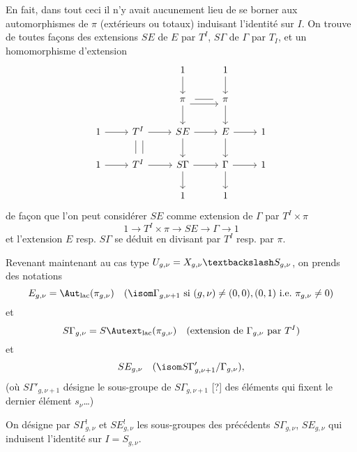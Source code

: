 En fait, dans tout ceci il n'y avait aucunement lieu de se borner aux automorphismes de $\pi$ (extérieurs ou totaux) induisant l'identité sur $I$. On trouve de toutes fa\c{c}ons des extensions $SE$ de $E$ par $T^I$, $S \Gamma$ de $\Gamma$ par $T_I$, et un homomorphisme d'extension
\[\begin{tikzcd}
	&& 1 & 1 \\
	&& \pi & \pi \\
	1 & {T^I} & SE & E & 1 \\
	1 & {T^I} & S\Gamma & \Gamma & 1 \\
	&& 1 & 1
	\arrow[from=1-3, to=2-3]
	\arrow[from=1-4, to=2-4]
	\arrow[shift right=2, from=2-3, to=2-4]
	\arrow[shorten <=5pt, shorten >=5pt, no head, from=2-3, to=2-4]
	\arrow[from=2-4, to=3-4]
	\arrow[from=2-3, to=3-3]
	\arrow[from=3-4, to=4-4]
	\arrow[from=3-3, to=4-3]
	\arrow[from=3-3, to=3-4]
	\arrow[from=4-3, to=4-4]
	\arrow[from=4-3, to=5-3]
	\arrow[from=4-4, to=5-4]
	\arrow[from=4-4, to=4-5]
	\arrow[from=3-4, to=3-5]
	\arrow[from=3-2, to=3-3]
	\arrow[from=4-2, to=4-3]
	\arrow[from=4-1, to=4-2]
	\arrow[from=3-1, to=3-2]
	\arrow[shift left=2, shorten <=2pt, shorten >=2pt, no head, from=3-2, to=4-2]
	\arrow[shift right=1, shorten <=2pt, shorten >=2pt, no head, from=3-2, to=4-2]
\end{tikzcd}\]
de fa\c{c}on que l'on peut considérer $SE$ comme extension de $\Gamma$ par $T^I \times \pi$
$$
1 \to T^I \times \pi \to SE \to \Gamma \to 1
$$
et l'extension $E$ resp. $S\Gamma$ se déduit en divisant par $T^I$ resp. par $\pi$.

Revenant maintenant au cas type $U_{g, \nu} = X_{g, \nu} \textbackslash S_{g, \nu}$, on prends des notations
$$
E_{g, \nu} = \Aut_{\text{lac}}(\pi_{g, \nu}) \quad (\isom \Gamma_{g, \nu + 1}~\text{si}~(g, \nu) \neq (0, 0), (0, 1)~\text{i.e.}~\pi_{g, \nu} \neq 0)
$$
et 
$$
S \Gamma_{g, \nu} = S \Autext_{\text{lac}}(\pi_{g, \nu}) \quad \text{(extension de}~\Gamma_{g, \nu}~\text{par}~T^I)
$$
et
$$
SE_{g, \nu} \quad (\isom S \Gamma'_{g, \nu + 1}/\Gamma_{g, \nu}),
$$
(où $S \Gamma'_{g, \nu + 1}$ désigne le sous-groupe de $S \Gamma_{g, \nu + 1}$ [?] des éléments qui fixent le dernier élément $s_\nu$\dots)

On désigne par $S\Gamma^!_{g, \nu}$ et $S E^!_{g, \nu}$ les sous-groupes des précédents $S \Gamma_{g, \nu}$, $SE_{g, \nu}$ qui induisent l'identité sur $I = S_{g, \nu}$.

